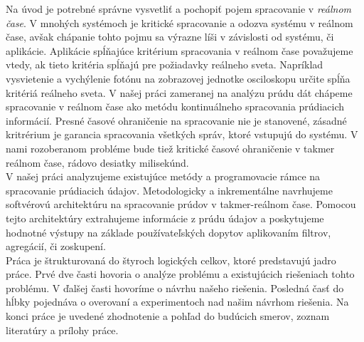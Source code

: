 	Na úvod je potrebné správne vysvetliť a pochopiť pojem spracovanie v \textit{reálnom čase}. V mnohých systémoch je kritické spracovanie a odozva systému v reálnom čase, avšak chápanie tohto pojmu sa výrazne líši v závislosti od systému, či aplikácie. Aplikácie spĺňajúce kritérium spracovania v reálnom čase považujeme vtedy, ak tieto kritéria spĺňajú pre požiadavky reálneho sveta. 
	Napríklad vysvietenie a vychýlenie fotónu na zobrazovej jednotke osciloskopu určite spĺňa kritériá reálneho sveta. V našej práci zameranej na analýzu prúdu dát chápeme spracovanie v reálnom čase ako metódu kontinuálneho spracovania prúdiacich informácií. Presné časové ohraničenie na spracovanie nie je stanovené, zásadné kritrérium je garancia spracovania všetkých správ, ktoré vstupujú do systému. V nami rozoberanom probléme bude tiež kritické časové ohraničenie v takmer reálnom čase, rádovo desiatky milisekúnd. 
\\
V našej práci analyzujeme existujúce metódy a programovacie rámce na spracovanie prúdiacich údajov. Metodologicky a inkrementálne navrhujeme softvérovú architektúru na spracovanie prúdov v takmer-reálnom čase. Pomocou tejto architektúry extrahujeme informácie z prúdu údajov a poskytujeme hodnotné výstupy na základe používateľských dopytov aplikovaním filtrov, agregácií, či zoskupení. 
\\
Práca je štrukturovaná do štyroch logických celkov, ktoré predstavujú jadro práce. Prvé dve časti hovoria o analýze problému a existujúcich riešeniach tohto problému. V ďalšej časti hovoríme o návrhu našeho riešenia. Posledná časť do hĺbky pojednáva o overovaní a experimentoch nad našim návrhom riešenia. Na konci práce je uvedené zhodnotenie a pohľad do budúcich smerov, zoznam literatúry a prílohy práce.


